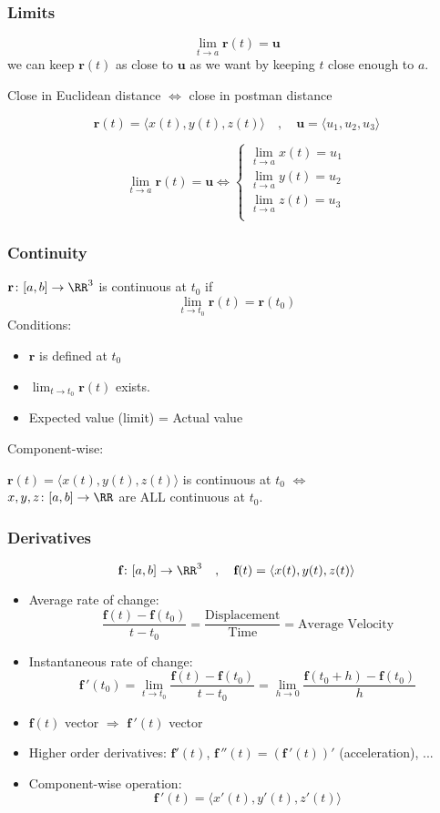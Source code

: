 \begin{frame}
    \frametitle{Limits}
    $$\lim_{t\to a} \textbf{r}(t) = \textbf{u}$$
    we can keep $\textbf{r}(t)$ as close to $\textbf{u}$ as we want by
    keeping $t$ close enough to $a$.

    \bigskip \pause

    Close in Euclidean distance $\Longleftrightarrow$ close in postman distance

    $$\textbf{r}(t) = \langle x(t), y(t), z(t) \rangle \quad , \quad \textbf{u}=\langle u_1,u_2,u_3\rangle$$

    $$\lim_{t\to a} \textbf{r}(t) = \textbf{u} \Longleftrightarrow
    \left\{
    \begin{array}{l}
      \lim_{t\to a} x(t) = u_1\\
      \lim_{t\to a} y(t) = u_2\\
      \lim_{t\to a} z(t) = u_3\\
    \end{array}
    \right.$$
\end{frame}

\begin{frame}
  \frametitle{Continuity}
  $\textbf{r} \colon [a,b] \to \RR^3$ is continuous at $t_0$ if
  $$\lim_{t\to t_0} \textbf{r}(t) = \textbf{r}(t_0)$$
  Conditions:\pause
  \begin{itemize}
    \item $\textbf{r}$ is defined at $t_0$
    \item $\lim_{t\to t_0} \textbf{r}(t)$ exists.
    \item Expected value (limit) = Actual value
  \end{itemize}
  \pause
  Component-wise:

  $\textbf{r}(t) = \langle x(t), y(t), z(t) \rangle$ is continuous at $t_0$ $\Longleftrightarrow$\\
  $x, y, z \colon [a,b] \to \RR$ are ALL continuous at $t_0$.

\end{frame}

\begin{frame}
  \frametitle{Derivatives}
  $$\textbf{f}\colon [a,b]\to \RR^3\quad , \quad \textbf{f}(t) = \langle x(t), y(t), z(t)\rangle$$
 \begin{itemize}
   \item  Average rate of change:
  $$\frac{\textbf{f}(t)-\textbf{f}(t_0)}{t-t_0} = \frac{\text{Displacement}}{\text{Time}} =
  \text{Average Velocity}$$
  \item Instantaneous rate of change:
  $$\textbf{f}\,'(t_0) = \lim_{t\to t_0} \frac{\textbf{f}(t)-\textbf{f}(t_0)}{t-t_0} =
  \lim_{h\to 0}\frac{\textbf{f}(t_0+h)-\textbf{f}(t_0)}{h}$$
  \item $\textbf{f}(t)$ vector $\Longrightarrow$ $\textbf{f}\,'(t)$ vector
  \item Higher order derivatives: $\textbf{f}'(t)$, $\textbf{f}\,''(t) = (\textbf{f}\,'(t))'$ (acceleration), ...
  \item Component-wise operation:
  $$\textbf{f}\,'(t) = \langle x'(t), y'(t), z'(t)\rangle$$
 \end{itemize}

\end{frame}

